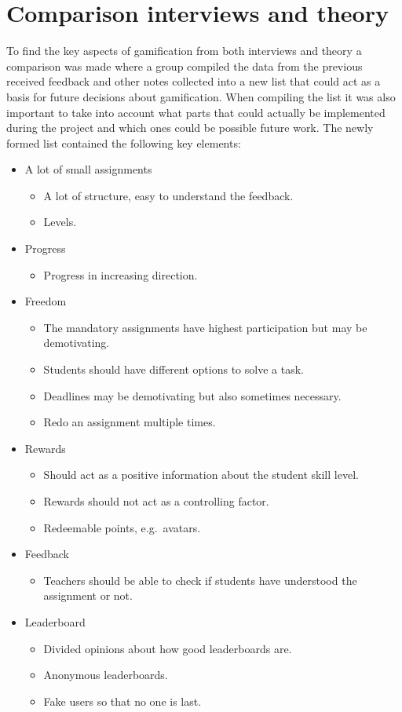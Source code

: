 \section{Comparison interviews and theory} 
To find the key aspects of gamification from both interviews and theory a comparison was made where a group compiled the data from the previous received feedback and other notes collected into a new list that could act as a basis for future decisions about gamification.
When compiling the list it was also important to take into account what parts that could actually be implemented during the project and which ones could be possible future work.
The newly formed list contained the following key elements:
\begin{itemize}
\item A lot of small assignments
\begin{itemize}
 \item A lot of structure, easy to understand the feedback.
 \item Levels.
\end{itemize}
\item Progress
\begin{itemize}
 \item Progress in increasing direction.
\end{itemize}
\item Freedom
\begin{itemize}
 \item The mandatory assignments have highest participation but may be demotivating.
 \item Students should have different options to solve a task.
 \item Deadlines may be demotivating but also sometimes necessary.
 \item Redo an assignment multiple times.
\end{itemize}
\item Rewards
\begin{itemize}
 \item Should act as a positive information about the student skill level.
 \item Rewards should not act as a controlling factor.
 \item Redeemable points, e.g.\ avatars.
\end{itemize}
\item Feedback
\begin{itemize}
 \item Teachers should be able to check if students have understood the assignment or not.
\end{itemize}
\item Leaderboard
\begin{itemize}
 \item Divided opinions about how good leaderboards are.
 \item Anonymous leaderboards.
 \item Fake users so that no one is last.
\end{itemize}
\end{itemize}


